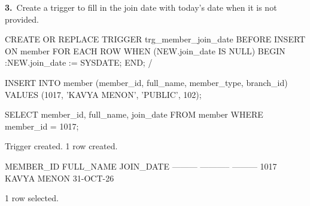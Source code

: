\noindent\begin{minipage}{\linewidth}
\begingroup{}
{\fontsize{14}{17}\selectfont\textbf{3.}}\ Create a trigger to fill in the join date with today's date when it is not provided.\par
\endgroup\vspace{12pt}


\begin{sqlcode}
CREATE OR REPLACE TRIGGER trg_member_join_date
BEFORE INSERT ON member
FOR EACH ROW
WHEN (NEW.join_date IS NULL)
BEGIN
   :NEW.join_date := SYSDATE;
END;
/

INSERT INTO member (member_id, full_name, member_type, branch_id)
VALUES (1017, 'KAVYA MENON', 'PUBLIC', 102);

SELECT member_id, full_name, join_date FROM member WHERE member_id = 1017;
\end{sqlcode}

\vspace{18pt}


\begin{sqlout}[fontsize=\small]
Trigger created.
1 row created.

MEMBER_ID  FULL_NAME    JOIN_DATE
---------  -----------  ---------
     1017  KAVYA MENON  31-OCT-26

1 row selected.
\end{sqlout}
\end{minipage}\par\vspace{24pt}

